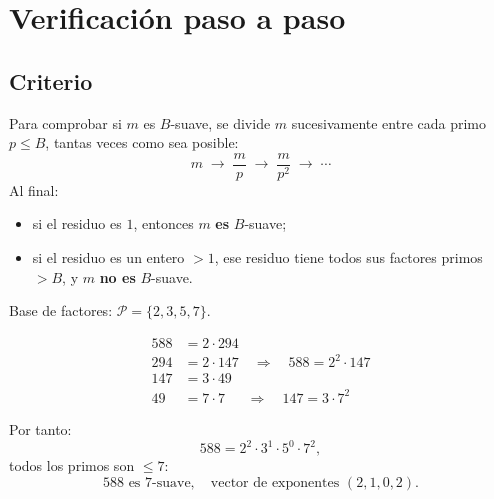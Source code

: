 \section{Verificación paso a paso}

\subsection{Criterio}

Para comprobar si $m$ es $B$-suave, se divide $m$ sucesivamente entre cada
primo $p \le B$, tantas veces como sea posible:
\begin{equation}
m \;\longrightarrow\; \frac{m}{p} \;\longrightarrow\;
\frac{m}{p^2} \;\longrightarrow\; \cdots
\end{equation}
Al final:
\begin{itemize}
\item si el residuo es $1$, entonces $m$ \textbf{es} $B$-suave;
\item si el residuo es un entero $> 1$, ese residuo tiene todos sus factores
      primos $> B$, y $m$ \textbf{no es} $B$-suave.
\end{itemize}

\begin{ejemplo}[$m = 588$, $B = 7$]
Base de factores: $\mathcal{P} = \{2, 3, 5, 7\}$.

\begin{align}
588 &= 2 \cdot 294 \\
294 &= 2 \cdot 147 \quad\Rightarrow\quad 588 = 2^2 \cdot 147 \\[4pt]
147 &= 3 \cdot 49 \\
49  &= 7 \cdot 7 \quad\;\;\Rightarrow\quad 147 = 3 \cdot 7^2
\end{align}

Por tanto:
\begin{equation}
588 = 2^2 \cdot 3^1 \cdot 5^0 \cdot 7^2,
\end{equation}
todos los primos son $\le 7$:
\begin{equation}
588 \text{ es } 7\text{-suave}, \quad
\text{vector de exponentes } (2, 1, 0, 2).
\end{equation}
\end{ejemplo}


